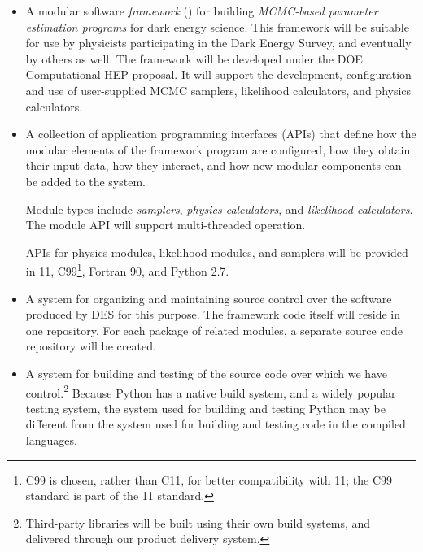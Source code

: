 \documentclass[draftmode,draftwater]{memarticle}
\newcommand{\facs}{\name{FACS}\xspace}
\newcommand{\cosmosis}{\name{CosmoSIS}\xspace}
\begin{document}
\begin{itemize}

\item A modular software \emph{framework} (\cosmosis) for building
  \emph{MCMC-based parameter estimation programs} for dark energy
  science. This framework will be suitable for use by physicists
  participating in the Dark Energy Survey, and eventually by others as
  well. The framework will be developed under the DOE Computational HEP
  \facs proposal. It will support the development, configuration and use
  of user-supplied MCMC samplers, likelihood calculators, and physics
  calculators.

\item A collection of application programming interfaces (APIs) that
  define how the modular elements of the framework program are
  configured, how they obtain their input data, how they interact, and
  how new modular components can be added to the system.

  Module types include \emph{samplers}, \emph{physics calculators}, and
  \emph{likelihood calculators}. The module API will support
  multi-threaded operation.


  APIs for physics modules, likelihood modules, and samplers will be
  provided in \cpp{}11, C99\footnote{C99 is chosen, rather than C11, for
    better compatibility with \cpp{}11; the C99 standard is part of the
    \cpp{}11 standard.}, Fortran 90, and Python 2.7.

\item A system for organizing and maintaining source control over the
  software produced by DES for this purpose. The \cosmosis framework
  code itself will reside in one repository. For each package of related
  modules, a separate source code repository will be created.

\item A system for building and testing of the source code over which we
  have control.\footnote{Third-party libraries will be built using their
    own build systems, and delivered through our product delivery
    system.} Because Python has a native build system, and a widely
  popular testing system, the system used for building and testing
  Python may be different from the system used for building and testing
  code in the compiled languages.


\end{itemize}
\end{document}
